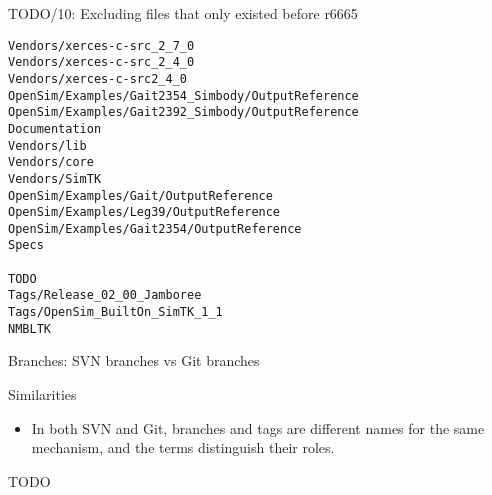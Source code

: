 \documentclass[pdf, 8pt]{beamer}
\def\NUMDECISIONS{10}
\begin{document}
\begin{frame}[fragile]{TODO/\NUMDECISIONS: Excluding files that only existed
before r6665}

\begin{Verbatim}
Vendors/xerces-c-src_2_7_0
Vendors/xerces-c-src_2_4_0
Vendors/xerces-c-src2_4_0
OpenSim/Examples/Gait2354_Simbody/OutputReference
OpenSim/Examples/Gait2392_Simbody/OutputReference
Documentation
Vendors/lib
Vendors/core
Vendors/SimTK
OpenSim/Examples/Gait/OutputReference
OpenSim/Examples/Leg39/OutputReference
OpenSim/Examples/Gait2354/OutputReference
Specs

TODO
Tags/Release_02_00_Jamboree
Tags/OpenSim_BuiltOn_SimTK_1_1
NMBLTK
\end{Verbatim}

\end{frame}

\begin{frame}{Branches: SVN branches vs Git branches}

Similarities
\begin{itemize}
    \item In both SVN and Git, branches and tags are different names for the
    same mechanism, and the terms distinguish their roles.
\end{itemize}

TODO


\end{frame}
\end{document}

